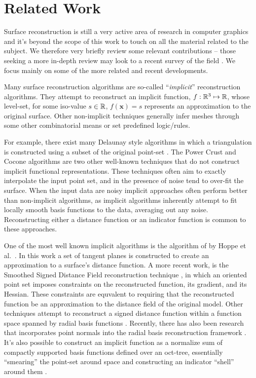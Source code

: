 \section{Related Work}
Surface reconstruction is still a very active area of research in computer 
graphics and it's beyond the scope of this work to touch on all the material 
related to the subject. We therefore very briefly review some relevant contributions -- 
those seeking a more in-depth review may look to a recent survey of the field 
\cite{reconstar_eg14}. We focus mainly on some of the more related and recent 
developments. 

Many surface reconstruction algorithms are so-called 
``\emph{implicit}'' reconstruction algorithms. They attempt to 
reconstruct an implicit function, $f : \mathbb{R}^3 \mapsto \mathbb{R} $, whose 
level-set, for some iso-value $s \in \mathbb{R}$, $f(\mathbf{x})=s$ represents an
approximation to the original surface. Other non-implicit techniques
generally infer meshes through some other combinatorial means 
or set predefined logic/rules.

For example, there exist many Delaunay style algorithms in which a 
triangulation is constructed using a subset of the original point-set 
\cite{delaunay}. The Power Crust \cite{powercrust} and Cocone \cite{cocone} 
algorithms are two other well-known techniques that do not construct 
implicit functional representations. These techniques
often aim to exactly interpolate the input point set, and in the presence of
noise tend to over-fit the surface. When the input data are noisy
implicit approaches often perform better than non-implicit algorithms, 
as implicit algorithms inherently attempt to fit locally smooth basis 
functions to the data, averaging out any noise. Reconstructing either 
a distance function or an indicator function is common to these 
approaches.

One of the most well known implicit algorithms is the algorithm of 
by Hoppe et al.~\cite{hoppecut}. In this work a set of
tangent planes is constructed to create an approximation to a
surface's distance function. A more recent work, is the Smoothed
Signed Distance Field reconstruction technique \cite{ssdrecon}, in
which an oriented point set imposes constraints on the reconstructed
function, its gradient, and its Hessian. These constraints are
equvalent to requiring that the reconstructed function be an
approximation to the distance field of the original model. Other
techniques attempt to reconstruct a signed distance function within a
function space spanned by radial basis functions \cite{radial}.
Recently, there has also been research that incorporates point normals
into the radial basis reconstruction framework \cite{hermite}. It's also
possible to construct an implicit function as a normalize sum of 
compactly supported basis functions defined over an oct-tree, 
essentially ``smearing'' the point-set around space and constructing 
an indicator ``shell'' around them \cite{Fuhrmann2014}.

